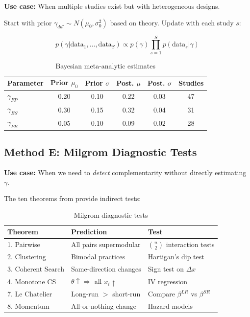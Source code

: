 \documentclass[11pt,a4paper]{article}
\theoremstyle{definition}
\begin{document}
\textbf{Use case:} When multiple studies exist but with heterogeneous designs.

Start with prior $\gamma_{dd'} \sim N(\mu_0, \sigma_0^2)$ based on theory.
Update with each study $s$:

\begin{equation}
p(\gamma | \text{data}_1, \ldots, \text{data}_S) \propto p(\gamma) \prod_{s=1}^{S} p(\text{data}_s | \gamma)
\end{equation}

\begin{table}[h]
\centering
\small
\begin{tabular}{lccccc}
\toprule
\textbf{Parameter} & \textbf{Prior $\mu_0$} & \textbf{Prior $\sigma$} & \textbf{Post. $\mu$} & \textbf{Post. $\sigma$} & \textbf{Studies} \\
\midrule
$\gamma_{FP}$ & 0.20 & 0.10 & 0.22 & 0.03 & 47 \\
$\gamma_{ES}$ & 0.30 & 0.15 & 0.32 & 0.04 & 31 \\
$\gamma_{FE}$ & 0.05 & 0.10 & 0.09 & 0.02 & 28 \\
\bottomrule
\end{tabular}
\caption{Bayesian meta-analytic estimates}
\label{tab:bayesian-meta}
\end{table}

\subsection{Method E: Milgrom Diagnostic Tests}

\textbf{Use case:} When we need to \textit{detect} complementarity without 
directly estimating $\gamma$.

The ten theorems from \citet{brynjolfsson2013complementarity} provide indirect 
tests:

\begin{table}[h]
\centering
\small
\begin{tabular}{p{2.5cm}p{4cm}p{5cm}}
\toprule
\textbf{Theorem} & \textbf{Prediction} & \textbf{Test} \\
\midrule
1. Pairwise & All pairs supermodular & $\binom{n}{2}$ interaction tests \\
2. Clustering & Bimodal practices & Hartigan's dip test \\
3. Coherent Search & Same-direction changes & Sign test on $\Delta x$ \\
4. Monotone CS & $\theta \uparrow \Rightarrow$ all $x_i \uparrow$ & IV regression \\
7. Le Chatelier & Long-run $>$ short-run & Compare $\beta^{LR}$ vs $\beta^{SR}$ \\
8. Momentum & All-or-nothing change & Hazard models \\
\bottomrule
\end{tabular}
\caption{Milgrom diagnostic tests}
\label{tab:milgrom}
\end{table}
\end{document}
